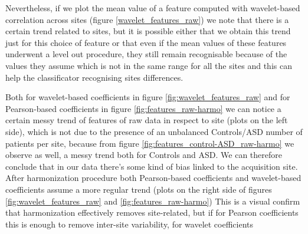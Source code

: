 \documentclass[11pt]{report}
\begin{document}
Nevertheless, if we plot the mean value of a feature computed with wavelet-based correlation across sites (figure \ref{wavelet_features_raw}) we note that there is a certain trend related to sites, but it is possible either that we obtain this trend just for this choice of feature or that even if the mean values of these features underwent a level out procedure, they still remain recognisable because of the values they assume which is not in the same range for all the sites and this can help the classificator recognising sites differences.

\hfill

Both for wavelet-based coefficients in figure \ref{fig:wavelet_features_raw} and for Pearson-based coefficients in figure \ref{fig:features_raw-harmo} we can notice a certain messy trend of features of raw data in respect to site (plots on the left side), which is not due to the presence of an unbalanced Controls/ASD number of patients per site, because from figure \ref{fig:features_control-ASD_raw-harmo} we observe as well, a messy trend both for Controls and ASD.
We can therefore conclude that in our data there's some kind of bias linked to the acquisition site.
After harmonization procedure both Pearson-based coefficients and wavelet-based coefficients assume a more regular trend (plots on the right side of figures  \ref{fig:wavelet_features_raw} and \ref{fig:features_raw-harmo})
This is a visual confirm that harmonization effectively removes site-related, but if for Pearson coefficients this is enough to remove inter-site variability, for wavelet coefficients

\end{document}
